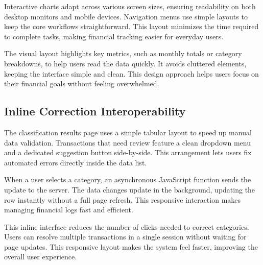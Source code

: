 Interactive charts adapt across various screen sizes, ensuring readability on both desktop monitors and mobile devices. Navigation menus use simple layouts to keep the core workflows straightforward. This layout minimizes the time required to complete tasks, making financial tracking easier for everyday users.

The visual layout highlights key metrics, such as monthly totals or category breakdowns, to help users read the data quickly. It avoids cluttered elements, keeping the interface simple and clean. This design approach helps users focus on their financial goals without feeling overwhelmed.

\subsection{Inline Correction Interoperability}
The classification results page uses a simple tabular layout to speed up manual data validation. Transactions that need review feature a clean dropdown menu and a dedicated suggestion button side-by-side. This arrangement lets users fix automated errors directly inside the data list.

When a user selects a category, an asynchronous JavaScript function sends the update to the server. The data changes update in the background, updating the row instantly without a full page refresh. This responsive interaction makes managing financial logs fast and efficient.

This inline interface reduces the number of clicks needed to correct categories. Users can resolve multiple transactions in a single session without waiting for page updates. This responsive layout makes the system feel faster, improving the overall user experience.
